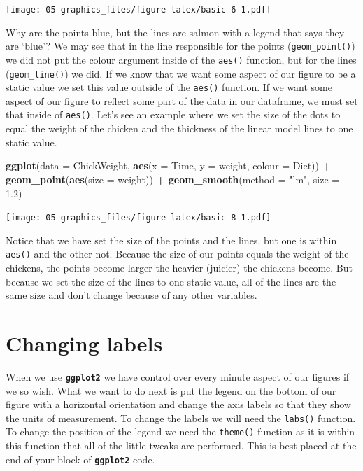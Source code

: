 \documentclass[
]{book}
\newenvironment{Shaded}{\begin{snugshade}}{\end{snugshade}}
\newcommand{\DataTypeTok}[1]{\textcolor[rgb]{0.13,0.29,0.53}{#1}}
\newcommand{\FloatTok}[1]{\textcolor[rgb]{0.00,0.00,0.81}{#1}}
\newcommand{\KeywordTok}[1]{\textcolor[rgb]{0.13,0.29,0.53}{\textbf{#1}}}
\newcommand{\NormalTok}[1]{#1}
\newcommand{\OperatorTok}[1]{\textcolor[rgb]{0.81,0.36,0.00}{\textbf{#1}}}
\newcommand{\StringTok}[1]{\textcolor[rgb]{0.31,0.60,0.02}{#1}}
\begin{document}
\texttt{[image: 05-graphics\_files/figure-latex/basic-6-1.pdf]}

Why are the points blue, but the lines are salmon with a legend that says they are `blue'? We may see that in the line responsible for the points (\texttt{geom\_point()}) we did not put the colour argument inside of the \texttt{aes()} function, but for the lines (\texttt{geom\_line()}) we did. If we know that we want some aspect of our figure to be a static value we set this value outside of the \texttt{aes()} function. If we want some aspect of our figure to reflect some part of the data in our dataframe, we must set that inside of \texttt{aes()}. Let's see an example where we set the size of the dots to equal the weight of the chicken and the thickness of the linear model lines to one static value.

\begin{Shaded}
\begin{Highlighting}[]
\KeywordTok{ggplot}\NormalTok{(}\DataTypeTok{data =}\NormalTok{ ChickWeight, }\KeywordTok{aes}\NormalTok{(}\DataTypeTok{x =}\NormalTok{ Time, }\DataTypeTok{y =}\NormalTok{ weight, }\DataTypeTok{colour =}\NormalTok{ Diet)) }\OperatorTok{+}
\StringTok{  }\KeywordTok{geom\_point}\NormalTok{(}\KeywordTok{aes}\NormalTok{(}\DataTypeTok{size =}\NormalTok{ weight)) }\OperatorTok{+}
\StringTok{  }\KeywordTok{geom\_smooth}\NormalTok{(}\DataTypeTok{method =} \StringTok{"lm"}\NormalTok{, }\DataTypeTok{size =} \FloatTok{1.2}\NormalTok{)}
\end{Highlighting}
\end{Shaded}

\texttt{[image: 05-graphics\_files/figure-latex/basic-8-1.pdf]}

Notice that we have set the size of the points and the lines, but one is within \texttt{aes()} and the other not. Because the size of our points equals the weight of the chickens, the points become larger the heavier (juicier) the chickens become. But because we set the size of the lines to one static value, all of the lines are the same size and don't change because of any other variables.

\hypertarget{changing-labels}{%
\section{Changing labels}\label{changing-labels}}

When we use \textbf{\texttt{ggplot2}} we have control over every minute aspect of our figures if we so wish. What we want to do next is put the legend on the bottom of our figure with a horizontal orientation and change the axis labels so that they show the units of measurement. To change the labels we will need the \texttt{labs()} function. To change the position of the legend we need the \texttt{theme()} function as it is within this function that all of the little tweaks are performed. This is best placed at the end of your block of \textbf{\texttt{ggplot2}} code.
\end{document}
